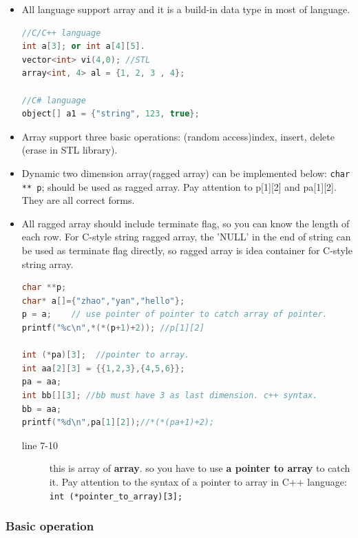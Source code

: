 \documentclass[a4paper,11pt,twoside]{book}
\begin{document}
\begin{itemize}
	\item All language support array and it is a build-in data type in most of language.  
\begin{lstlisting}[frame=single, language=c++]
//C/C++ language
int a[3]; or int a[4][5].  
vector<int> vi(4,0); //STL
array<int, 4> al = {1, 2, 3 , 4};
  
//C# language 
object[] a1 = {"string", 123, true};
\end{lstlisting}

	\item Array support three basic operations: (random access)index, insert, delete (erase in STL library).  

	\item Dynamic two dimension array(ragged array) can be implemented below:  \texttt{char ** p}; should be used as ragged array. Pay attention to p[1][2] and pa[1][2]. They are all correct forms.

	\item All ragged array should include terminate flag, so you can know the length of each row.  For C-style string ragged array, the 'NULL' in the end of string can be used as terminate flag directly, so ragged array is idea container for C-style string array. 

\begin{lstlisting}[frame=single, language=c++]
char **p;
char* a[]={"zhao","yan","hello"}; 
p = a;    // use pointer of pointer to catch array of pointer.
printf("%c\n",*(*(p+1)+2)); //p[1][2]

int (*pa)[3];  //pointer to array.
int aa[2][3] = {{1,2,3},{4,5,6}};
pa = aa;
int bb[][3]; //bb must have 3 as last dimension. c++ syntax.
bb = aa;
printf("%d\n",pa[1][2]);//*(*(pa+1)+2);
\end{lstlisting} 
\begin{description}
	\item[line 7-10] this is array of \textbf{array}. so you have to use \textbf{a pointer to array} to catch it. Pay attention to the syntax of a pointer to array in C++ language: \texttt{int (*pointer\_to\_array)[3];}
\end{description}

\end{itemize}

\subsubsection{Basic operation}
\end{document}
